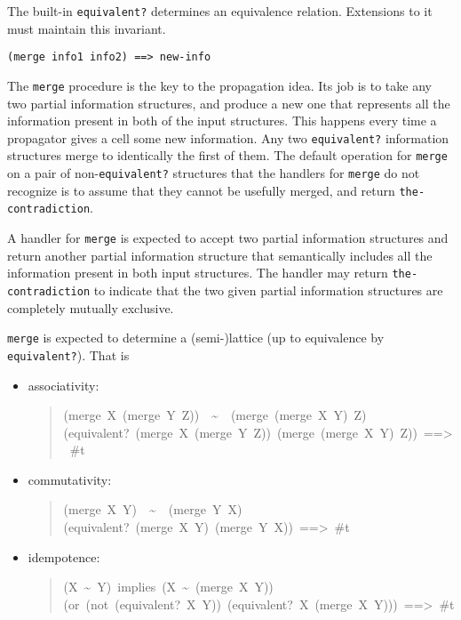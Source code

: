 \documentclass[12pt,letterpaper,english]{article}
\begin{document}
The built-in \texttt{equivalent?} determines an equivalence relation.
Extensions to it must maintain this invariant.

\texttt{(merge info1 info2)  ==>  new-info}

The \texttt{merge} procedure is the key to the propagation idea.  Its job
is to take any two partial information structures, and produce a new
one that represents all the information present in both of the
input structures.  This happens every time a propagator gives a cell
some new information.  Any two \texttt{equivalent?} information structures
merge to identically the first of them.  The default operation for
\texttt{merge} on a pair of non-\texttt{equivalent?} structures that the handlers for
\texttt{merge} do not recognize is to assume that they cannot be usefully
merged, and return \texttt{the-contradiction}.

A handler for \texttt{merge} is expected to accept two partial
information structures and return another partial information
structure that semantically includes all the information present in
both input structures.  The handler may return
\texttt{the-contradiction} to indicate that the two given partial
information structures are completely mutually exclusive.

\texttt{merge} is expected to determine a (semi-)lattice (up to equivalence
by \texttt{equivalent?}).  That is
\begin{itemize}
\item {} 
associativity:
\begin{quote}{\ttfamily \raggedright \noindent
(merge~X~(merge~Y~Z))~~{\textasciitilde}~~(merge~(merge~X~Y)~Z)~\\
(equivalent?~(merge~X~(merge~Y~Z))~(merge~(merge~X~Y)~Z))~==>~{\#}t
}\end{quote}
\item {} 
commutativity:
\begin{quote}{\ttfamily \raggedright \noindent
(merge~X~Y)~~{\textasciitilde}~~(merge~Y~X)~\\
(equivalent?~(merge~X~Y)~(merge~Y~X))~==>~{\#}t
}\end{quote}
\item {} 
idempotence:
\begin{quote}{\ttfamily \raggedright \noindent
(X~{\textasciitilde}~Y)~implies~(X~{\textasciitilde}~(merge~X~Y))~\\
(or~(not~(equivalent?~X~Y))~(equivalent?~X~(merge~X~Y)))~==>~{\#}t
}\end{quote}
\end{itemize}
\end{document}
